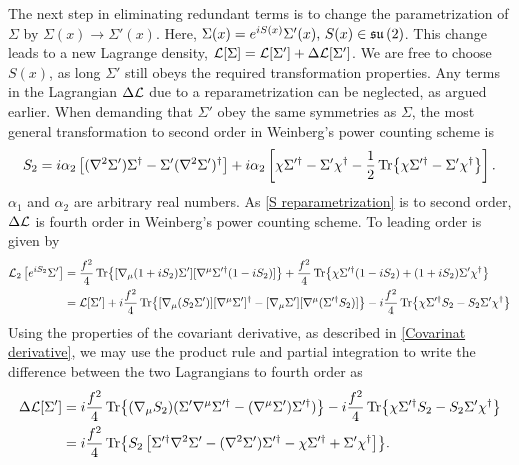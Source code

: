 The next step in eliminating redundant terms is to change the parametrization of $\Sigma$ by $\Sigma(x) \rightarrow \Sigma'(x)$. 
Here, $ \Sigma(x) = e^{iS(x)} \Sigma'(x), \, S(x) \in \mathfrak{su}\left(2\right)$. This change leads to a new Lagrange density, $\mathcal{L}[\Sigma] = \mathcal{L}[\Sigma'] + \Delta \mathcal{L}[\Sigma']$.
We are free to choose $S(x)$, as long $\Sigma'$ still obeys the required transformation properties.
Any terms in the Lagrangian $\Delta \mathcal{L}$ due to a reparametrization can be neglected, as argued earlier.
When demanding that $\Sigma'$ obey the same symmetries as $\Sigma$,
the most general transformation to second order in Weinberg's power counting scheme  is~\cite{Scherer2002IntroductionTC}
\begin{equation}
    \label{S reparametrization}
    S_{2} = 
    i \alpha_2 
    \left[
        (\nabla^2 \Sigma') \Sigma^\dagger - \Sigma' (\nabla^2 {\Sigma'})^\dagger
    \right]
    + i \alpha_2
    \left[
        \chi \Sigma'^\dagger - \Sigma' \chi^\dagger 
        - \frac{1}{2} \Tr{\chi \Sigma'^\dagger - \Sigma' \chi^\dagger}
    \right].
\end{equation}
$\alpha_1$ and $\alpha_2$ are arbitrary real numbers. As \autoref{S reparametrization} is to second order, $\Delta \mathcal{L}$ is fourth order in Weinberg's power counting scheme.
To leading order is given by
\begin{align*}
    \mathcal{L}_2\left[e^{i S_2}\Sigma '\right]
    & =
    \frac{f^2}{4}\Tr{[\nabla_\mu (1 +i S_2)\Sigma'][\nabla^\mu \Sigma'^\dagger  (1 - i S_2)]}
    + \frac{f^2}{4} \Tr{\chi\Sigma'^\dagger (1 - i S_2) + (1 +i S_2)\Sigma' \chi^\dagger} \\
    & = \mathcal{L}[\Sigma'] + 
    i \frac{f^2}{4}
    \Tr{[\nabla_\mu (S_2\Sigma')][\nabla^\mu\Sigma']^\dagger 
    -  [\nabla_\mu\Sigma'][\nabla^\mu (\Sigma'^\dagger  S_2) ]}
    - i \frac{f^2}{4} \Tr{\chi \Sigma'^\dagger S_2 - S_2 \Sigma' \chi^\dagger}
\end{align*}
Using the properties of the covariant derivative, as described in \autoref{Covarinat derivative}, we may use the product rule and partial integration to write the difference between the two Lagrangians to fourth order as
\begin{align*}
    \Delta \mathcal{L}[\Sigma'] 
    & = 
    i \frac{f^2}{4}
    \Tr{
        (\nabla_\mu S_2)
        (\Sigma' \nabla^\mu \Sigma'^\dagger - (\nabla^\mu \Sigma') \Sigma'^\dagger) 
    }
    - i \frac{f^2}{4} \Tr{\chi \Sigma'^\dagger  S_2 - S_2 \Sigma' \chi^\dagger} \\
    & = 
    i \frac{f^2}{4}
    \Tr{
        S_2
        \left[
            \Sigma'^\dagger\nabla^2 \Sigma' - ( \nabla^2 \Sigma') \Sigma'^\dagger 
            - \chi\Sigma'^\dagger + \Sigma' \chi^\dagger
        \right]
    }.
\end{align*}

